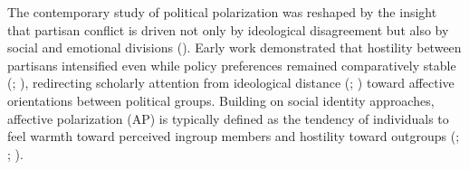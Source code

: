 \documentclass[
  12pt,
  a4paper,
  DIV=11,
  numbers=noendperiod]{scrartcl}
\begin{document}
The contemporary study of political polarization was reshaped by the
insight that partisan conflict is driven not only by ideological
disagreement but also by social and emotional divisions
().
Early work demonstrated that hostility between partisans intensified
even while policy preferences remained comparatively stable
(;
),
redirecting scholarly attention from ideological distance
(;
)
toward affective orientations between political groups. Building on
social identity approaches, affective polarization (AP) is typically
defined as the tendency of individuals to feel warmth toward perceived
ingroup members and hostility toward outgroups
(;
;
).
\end{document}
